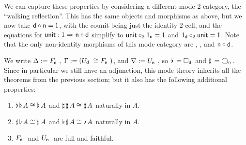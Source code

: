 \documentclass{drl-common/llncs}
\newcommand{\tc}[2]{\ensuremath{#1 \Rightarrow #2}}
\newcommand\compo[2]{\ensuremath{#1 \circ #2}}
\newcommand\comph[2]{\ensuremath{#1 \mathbin{\circ_2} #2}}
\newcommand\F[2]{\ensuremath{F_{#1} \,\, #2}}
\newcommand\U[2]{\ensuremath{U_{#1} \,\, #2}}
\newcommand\Bx[2]{\ensuremath{\Box_{#1} \, {#2}}}
\newcommand\Crc[2]{\ensuremath{\bigcirc_{#1} \, {#2}}}
\newcommand\Flat[1]{\ensuremath{\flat \, {#1}}}
\newcommand\Sharp[1]{\ensuremath{\sharp \, {#1}}}
\begin{document}
We can capture these properties by considering a different mode
2-category, the ``walking reflection''.  This has the same objects and
morphisms as above, but we now take $\compo{\dsd d}{\dsd n} = 1$, with
the counit being just the identity 2-cell, and the equations for
$\dsd{unit} : \tc {1} {\compo{\dsd n}{\dsd d}}$ simplify to
$\comph{\dsd{unit}}{1_{\dsd n}} = 1$ and $\comph{1_{\dsd d}}{\dsd{unit}}
= 1$.  Note that the only non-identity morphisms of this mode category
are , , and \compo{\dsd{n}}{\dsd{d}}.  

We write $\Delta := \F{\dsd{d}}{}$, $\Gamma := (\U{\dsd d}{} \iso
\F{\dsd n}{})$, and $\nabla := \U{\dsd{n}}{}$, so $\Flat{} =
\Bx{\dsd{d}}{}$ and $\Sharp{} = \Crc{\dsd{n}}{}$.  Since in particular
we still have an adjunction, this mode theory inherits all the theorems
from the previous section; but it also has the following additional
properties:

\begin{theorem}
\begin{enumerate}
\item $\Flat{\Flat A} \iso \Flat A$ and $\Sharp{\Sharp A} \iso \Sharp A$
  naturally in $A$.
\item $\Sharp{\Flat A} \iso \Sharp{A}$ 
and $\Flat{\Sharp A} \iso \Flat{A}$ naturally in $A$.
\item \F{\dsd{d}}{} and \U{\dsd{n}}{} are full and faithful.
\end{enumerate}
\end{theorem}
\end{document}
